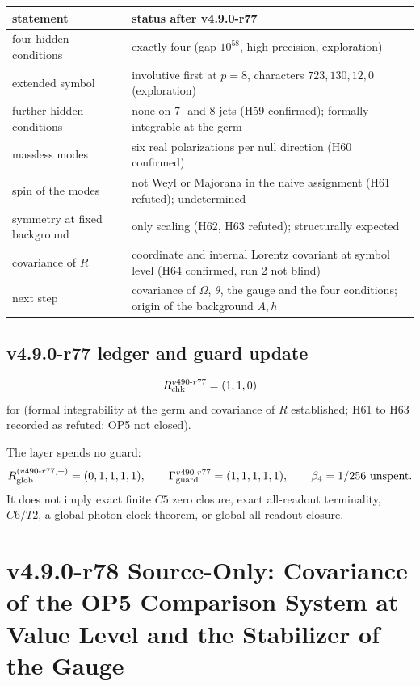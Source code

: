 \begin{center}
\small
\begin{tabular}{@{}>{\raggedright\arraybackslash}p{}>{\raggedright\arraybackslash}p{}@{}}
\toprule
statement & status after v4.9.0-r77\\
\midrule
four hidden conditions & exactly four (gap \(10^{58}\), high precision, exploration)\\
extended symbol & involutive first at \(p=8\), characters \(723,130,12,0\) (exploration)\\
further hidden conditions & none on 7- and 8-jets (H59 confirmed); formally integrable at the germ\\
massless modes & six real polarizations per null direction (H60 confirmed)\\
spin of the modes & not Weyl or Majorana in the naive assignment (H61 refuted); undetermined\\
symmetry at fixed background & only scaling (H62, H63 refuted); structurally expected\\
covariance of \(R\) & coordinate and internal Lorentz covariant at symbol level (H64 confirmed, run 2 not blind)\\
next step & covariance of \(\Omega\), \(\theta\), the gauge and the four conditions; origin of the background \(A,h\)\\
\bottomrule
\end{tabular}
\end{center}

\subsection*{v4.9.0-r77 ledger and guard update}
\label{subsec:v490-r77-ledger-guard}

\[
R_{\rm chk}^{v490\text{-}r77}=(1,1,0)
\]
for (formal integrability at the germ and covariance of \(R\) established; H61 to H63 recorded as refuted; OP5 not closed).

The layer spends no guard:
\[
R_{\rm glob}^{(v490\text{-}r77,+)}=(0,1,1,1,1),
\qquad
\Gamma_{\rm guard}^{v490\text{-}r77}=(1,1,1,1,1),
\qquad
\beta_4=1/256\ \text{unspent}.
\]
It does not imply exact finite \(C5\) zero closure, exact all-readout terminality,
\(C6/T2\), a global photon-clock theorem, or global all-readout closure.

\clearpage
\section*{v4.9.0-r78 Source-Only: Covariance of the OP5 Comparison System at Value Level and the Stabilizer of the Gauge}
\label{sec:v490-r78-value-covariance}


